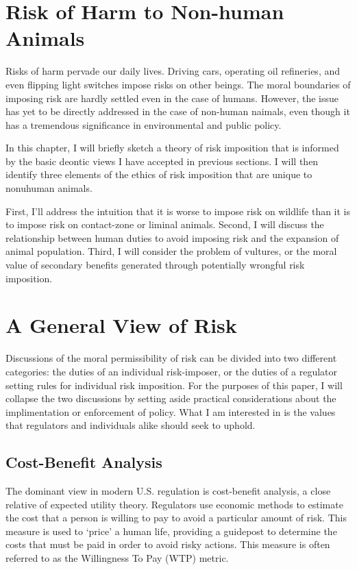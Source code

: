 \documentclass[12pt]{article}
\begin{document}
\section{Risk of Harm to Non-human Animals}

Risks of harm pervade our daily lives. Driving cars, operating oil refineries,
and even flipping light switches impose risks on other beings.  The moral
boundaries of imposing risk are hardly settled even in the case of humans.
However, the issue has yet to be directly addressed in the case of non-human
naimals, even though it has a tremendous significance in environmental and
public policy.

In this chapter, I will briefly sketch a theory of risk imposition that is informed by the basic deontic views I have accepted in previous sections.
I will then identify three elements of the ethics of risk imposition that are unique to nonuhuman animals.

First, I’ll address the intuition that it is worse to impose risk on wildlife than it is to impose risk on contact-zone or liminal animals.
Second, I will discuss the relationship between human duties to avoid imposing risk and the expansion of animal population.
Third, I will consider the problem of vultures, or the moral value of secondary benefits generated through potentially wrongful risk imposition.

\section{A General View of Risk}

Discussions of the moral permissibility of risk can be divided into two
different categories: the duties of an individual risk-imposer, or the duties
of a regulator setting rules for individual risk imposition. For the purposes
of this paper, I will collapse the two discussions by setting aside practical
considerations about the implimentation or enforcement of policy. What I am
interested in is the values that regulators and individuals alike should seek
to uphold.

\subsection{Cost-Benefit Analysis}

The dominant view in modern U.S. regulation is cost-benefit analysis, a close
relative of expected utility theory. Regulators use economic methods to
estimate the cost that a person is willing to pay to avoid a particular amount
of risk.  This measure is used to ‘price’ a human life, providing a guidepost
to determine the costs that must be paid in order to avoid risky actions. This
measure is often referred to as the Willingness To Pay (WTP) metric.
\end{document}

